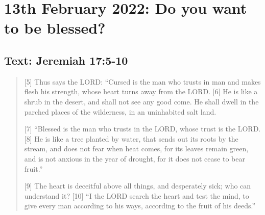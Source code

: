 \section{13th February 2022: Do you want to be blessed?}
\subsection*{Text: Jeremiah 17:5-10}
  \begin{quote}
    [5] Thus says the LORD:
    “Cursed is the man who trusts in man
        and makes flesh his strength,
        whose heart turns away from the LORD.
    [6] He is like a shrub in the desert,
        and shall not see any good come.
    He shall dwell in the parched places of the wilderness,
        in an uninhabited salt land.


    [7] “Blessed is the man who trusts in the LORD,
        whose trust is the LORD.
    [8] He is like a tree planted by water,
        that sends out its roots by the stream,
    and does not fear when heat comes,
        for its leaves remain green,
    and is not anxious in the year of drought,
        for it does not cease to bear fruit.”


    [9] The heart is deceitful above all things,
        and desperately sick;
        who can understand it?
    [10] “I the LORD search the heart
        and test the mind,
    to give every man according to his ways,
        according to the fruit of his deeds.”
  \end{quote}
